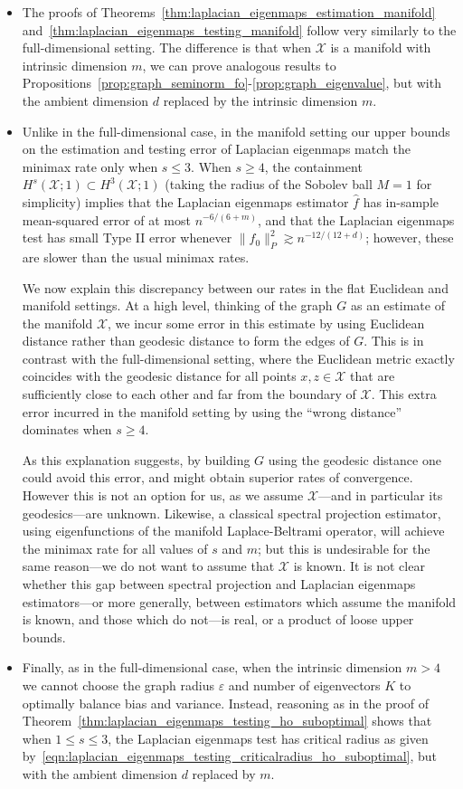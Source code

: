 \documentclass{article}
\newcommand{\1}{\mathbf{1}}
\newcommand{\mc}[1]{\mathcal{#1}}
\newcommand{\wh}[1]{\widehat{#1}}
\theoremstyle{alden}
\theoremstyle{aldenthm}
\theoremstyle{definition}
\theoremstyle{remark}
\begin{document}
\begin{itemize}
	\item The proofs of Theorems~\ref{thm:laplacian_eigenmaps_estimation_manifold} and~\ref{thm:laplacian_eigenmaps_testing_manifold} follow very similarly to the full-dimensional setting. The difference is that when $\mc{X}$ is a manifold with intrinsic dimension $m$, we can prove analogous results to Propositions~\ref{prop:graph_seminorm_fo}-\ref{prop:graph_eigenvalue}, but with the ambient dimension $d$ replaced by the intrinsic dimension $m$. 
	\item Unlike in the full-dimensional case, in the manifold setting our upper bounds on the estimation and testing error of Laplacian eigenmaps match the minimax rate only when $s \leq 3$.  When $s \geq 4$, the containment $H^s(\mc{X};1) \subset H^{3}(\mc{X};1)$ (taking the radius of the Sobolev ball $M = 1$ for simplicity) implies that the Laplacian eigenmaps estimator $\wh{f}$ has in-sample mean-squared error of at most $n^{-6/(6 + m)}$, and that the Laplacian eigenmaps test has small Type II error whenever $\|f_0\|_P^2 \gtrsim n^{-12/(12 + d)}$; however, these are slower than the usual minimax rates. 
	
	We now explain this discrepancy between our rates in the flat Euclidean and manifold settings. At a high level, thinking of the graph $G$ as an estimate of the manifold $\mc{X}$, we incur some error in this estimate by using Euclidean distance rather than geodesic distance to form the edges of $G$. This is in contrast with the full-dimensional setting, where the Euclidean metric exactly coincides with the geodesic distance for all points $x,z \in \mc{X}$ that are sufficiently close to each other and far from the boundary of $\mc{X}$. This extra error incurred in the manifold setting by using the ``wrong distance'' dominates when $s \geq 4$. 
	
	As this explanation suggests, by building $G$ using the geodesic distance one could avoid this error, and might obtain superior rates of convergence. However this is not an option for us, as we assume $\mc{X}$---and in particular its geodesics---are unknown. Likewise, a classical spectral projection estimator, using eigenfunctions of the manifold Laplace-Beltrami operator, will achieve the minimax rate for all values of $s$ and $m$; but this is undesirable for the same reason---we do not want to assume that $\mc{X}$ is known. It is not clear whether this gap between spectral projection and Laplacian eigenmaps estimators---or more generally, between estimators which assume the manifold is known, and those which do not---is real, or a product of loose upper bounds. 
	
	\item Finally, as in the full-dimensional case, when the intrinsic dimension $m > 4$ we cannot choose the graph radius $\varepsilon$ and number of eigenvectors $K$ to optimally balance bias and variance.  Instead, reasoning as in the proof of Theorem~\ref{thm:laplacian_eigenmaps_testing_ho_suboptimal} shows that when $1 \leq s \leq 3$, the Laplacian eigenmaps test has critical radius as given by~\eqref{eqn:laplacian_eigenmaps_testing_criticalradius_ho_suboptimal}, but with the ambient dimension $d$ replaced by $m$.
\end{itemize}
\end{document}
